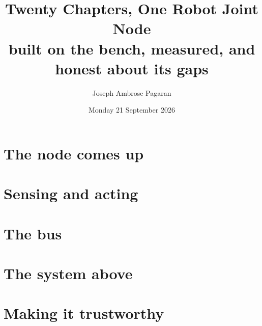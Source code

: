 \documentclass[11pt,a4paper]{article}
\title{\sffamily\bfseries Twenty Chapters, One Robot Joint Node\\[2pt]\large built on the bench, measured, and honest about its gaps}
\author{Joseph Ambrose Pagaran}
\date{Monday 21 September 2026}
\begin{document}
\maketitle
\thispagestyle{empty}

\clearpage
\tableofcontents
\clearpage

\part{The node comes up}

\part{Sensing and acting}

\part{The bus}

\part{The system above}

\part{Making it trustworthy}

\appendix
\clearpage

\end{document}

